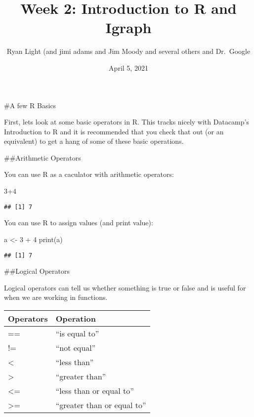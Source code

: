 \documentclass[
]{article}
\title{Week 2: Introduction to R and Igraph}
\author{Ryan Light (and jimi adams and Jim Moody and several others and
Dr.~Google}
\date{April 5, 2021}
\newenvironment{Shaded}{\begin{snugshade}}{\end{snugshade}}
\newcommand{\DecValTok}[1]{\textcolor[rgb]{0.00,0.00,0.81}{#1}}
\newcommand{\FunctionTok}[1]{\textcolor[rgb]{0.00,0.00,0.00}{#1}}
\newcommand{\NormalTok}[1]{#1}
\newcommand{\OtherTok}[1]{\textcolor[rgb]{0.56,0.35,0.01}{#1}}
\newcommand{\SpecialCharTok}[1]{\textcolor[rgb]{0.00,0.00,0.00}{#1}}
\begin{document}
\maketitle

\#A few R Basics

First, lets look at some basic operators in R. This tracks nicely with
Datacamp's Introduction to R and it is recommended that you check that
out (or an equivalent) to get a hang of some of these basic operations.

\#\#Arithmetic Operators

You can use R as a caculator with arithmetic operators:

\begin{Shaded}
\begin{Highlighting}[]
\DecValTok{3}\SpecialCharTok{+}\DecValTok{4}
\end{Highlighting}
\end{Shaded}

\begin{verbatim}
## [1] 7
\end{verbatim}

You can use R to assign values (and print value):

\begin{Shaded}
\begin{Highlighting}[]
\NormalTok{a }\OtherTok{\textless{}{-}} \DecValTok{3} \SpecialCharTok{+} \DecValTok{4}
\FunctionTok{print}\NormalTok{(a)}
\end{Highlighting}
\end{Shaded}

\begin{verbatim}
## [1] 7
\end{verbatim}

\#\#Logical Operators

Logical operators can tell us whether something is true or false and is
useful for when we are working in functions.

\begin{longtable}[]{@{}ll@{}}
\toprule
Operators & Operation \\
\midrule
\endhead
== & ``is equal to'' \\
!= & ``not equal'' \\
\textless{} & ``less than'' \\
\textgreater{} & ``greater than'' \\
\textless= & ``less than or equal to'' \\
\textgreater= & ``greater than or equal to'' \\
\bottomrule
\end{longtable}
\end{document}
